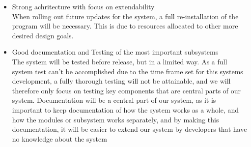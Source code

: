 \begin{itemize}
\item Strong achritecture with focus on extendability\\
When rolling out future updates for the system, a full re-installation of the program will be necessary. This is due to resources allocated to other more desired design goals.\\

\item Good documentation and Testing of the most important subsystems\\
The system will be tested before release, but in a limited way. As a full system test can’t be accomplished due to the time frame set for this systems development, a fully thorough testing will not be attainable, and we will therefore only focus on testing key components that are central parts of our system.
Documentation will be a central part of our system, as it is important to keep documentation of how the system works as a whole, and how the modules or subsystem works separately, and by making this documentation, it will be easier to extend our system by developers that have no knowledge about the system\\
\end{itemize}